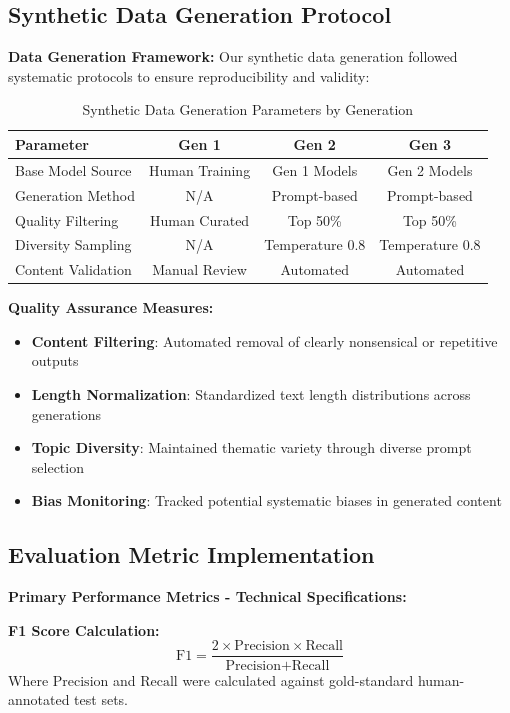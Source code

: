 \documentclass{article}
\begin{document}
\subsection{Synthetic Data Generation Protocol}

\textbf{Data Generation Framework:}
Our synthetic data generation followed systematic protocols to ensure reproducibility and validity:

\begin{table}[H]
\centering
\caption{Synthetic Data Generation Parameters by Generation}
\label{tab:data_generation_params}
\begin{tabular}{lccc}
\toprule
\textbf{Parameter} & \textbf{Gen 1} & \textbf{Gen 2} & \textbf{Gen 3} \\
\midrule
Base Model Source & Human Training & Gen 1 Models & Gen 2 Models \\
Generation Method & N/A & Prompt-based & Prompt-based \\
Quality Filtering & Human Curated & Top 50\% & Top 50\% \\
Diversity Sampling & N/A & Temperature 0.8 & Temperature 0.8 \\
Content Validation & Manual Review & Automated & Automated \\
\bottomrule
\end{tabular}
\end{table}

\textbf{Quality Assurance Measures:}
\begin{itemize}
    \item \textbf{Content Filtering}: Automated removal of clearly nonsensical or repetitive outputs
    \item \textbf{Length Normalization}: Standardized text length distributions across generations
    \item \textbf{Topic Diversity}: Maintained thematic variety through diverse prompt selection
    \item \textbf{Bias Monitoring}: Tracked potential systematic biases in generated content
\end{itemize}

\subsection{Evaluation Metric Implementation}

\textbf{Primary Performance Metrics - Technical Specifications:}

\textbf{F1 Score Calculation:}
\begin{equation}
\text{F1} = \frac{2 \times \text{Precision} \times \text{Recall}}{\text{Precision} + \text{Recall}}
\end{equation}
Where $\text{Precision}$ and $\text{Recall}$ were calculated against gold-standard human-annotated test sets.
\end{document}

